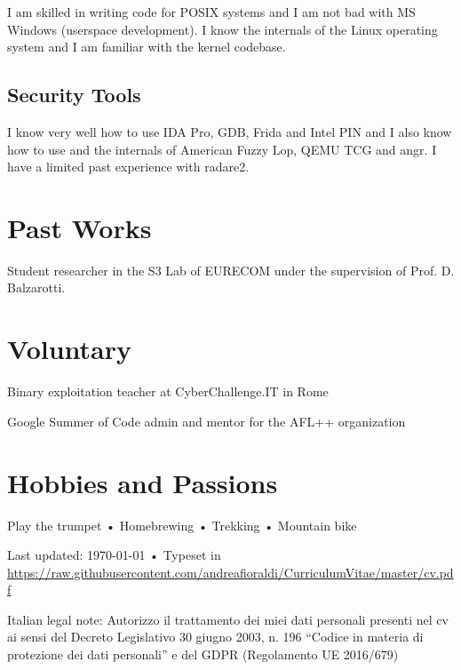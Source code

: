 \documentclass[10pt, a4paper]{article}
\newcommand{\years}[1]{\marginnote{\scriptsize #1}}
\begin{document}
I am skilled in writing code for POSIX systems and I am not bad with MS Windows (userspace development).
I know the internals of the Linux operating system and I am familiar with the kernel codebase.

\subsection*{Security Tools}

I know very well how to use IDA Pro, GDB, Frida and Intel PIN and I also know how to use and the internals of American Fuzzy Lop, QEMU TCG and angr.
I have a limited past experience with radare2.

\section*{Past Works}

\noindent
\years{2020} Student researcher in the S3 Lab of EURECOM under the supervision of Prof. D. Balzarotti.

\section*{Voluntary}
\noindent
\years{2018-2020}Binary exploitation teacher at CyberChallenge.IT in Rome

\years{2020}Google Summer of Code admin and mentor for the AFL++ organization

\section*{Hobbies and Passions}
Play the trumpet • Homebrewing • Trekking • Mountain bike

\vfill{}

\begin{center}
{\scriptsize  Last updated: \today\- •\- 
Typeset in \href{http://nitens.org/taraborelli/cvtex}{
\XeTeX }\\
\href{https://raw.githubusercontent.com/andreafioraldi/CurriculumVitae/master/cv.pdf}{https://raw.githubusercontent.com/andreafioraldi/CurriculumVitae/master/cv.pdf}}
\end{center}

{\scriptsize Italian legal note: Autorizzo il trattamento dei miei dati personali presenti nel cv ai sensi del Decreto Legislativo 30 giugno 2003, n. 196 “Codice in materia di protezione dei dati personali” e del GDPR (Regolamento UE 2016/679)}
\end{document}
